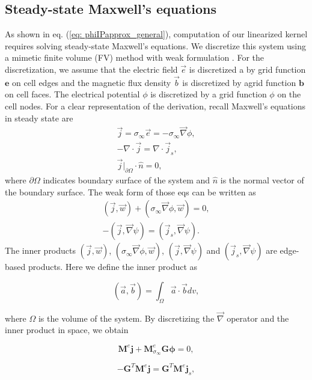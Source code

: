 \documentclass[extra,mreferee]{gji}
\renewcommand{\div}{\nabla\cdot}
\newcommand{\grad}{\vec \nabla}
\newcommand{\siginf}{\sigma_\infty}
\newcommand{\dgrad}{{\mathbf G}}
\newcommand{\M}{{\mathbf M}}
\newcommand{\MeSigInf}{{\M^e_{\sigma_\infty}}}
\newcommand{\Me}{{\M^e}}
\renewcommand {\j}  { {\vec j} }
\renewcommand {\b}  { {\vec b} }
\newcommand {\e}  { {\vec e} }
\renewcommand {\dj}  { {\mathbf{j} } }
\newcommand {\db}  { {\mathbf{b} } }
\newcommand {\de}  { {\mathbf{e} } }
\begin{document}
\subsection{Steady-state Maxwell's equations}
\label{section:maxwell_discrete}
As shown in eq. (\ref{eq: phiIPapprox_general}), computation of our linearized kernel requires solving steady-state Maxwell's equations. 
We discretize this system using a mimetic finite volume (FV) method with weak formulation \cite[]{Yee1966,Eldadbook}. 
For the discretization, we assume that the electric field $\e$ is discretized a by grid function $\de$ on cell edges and the magnetic flux density $\b$ is discretized by agrid function $\db$ on cell faces. 
The electrical potential $\phi$ is discretized by a grid function  $\phi$ on the cell nodes. For a clear representation of the derivation, recall Maxwell's equations in steady state are 
\begin{align}
  \j = \siginf\e = -\siginf\grad \phi, \\
  -\div \j = \div \j_s, \\
  \j\big|_{\partial \Omega}\cdot\hat{n} = 0,
  \label{eq:DCBCneumann}
\end{align}
where $\partial \Omega$ indicates boundary surface of the system and $\hat{n}$ is the normal vector of the boundary surface. The weak form of those eqs can be written as
\begin{align}
  (\j, \vec{w}) + (\siginf \grad \phi, \vec{w}) = 0, \\
  -(\j, \grad \psi) = (\j_s, \grad \psi).
\end{align}
The inner products $(\j, \vec{w})$, $(\siginf \grad \phi, \vec{w})$,  $(\j, \grad \psi)$ and $(\j_s, \grad \psi)$ are edge-based products. Here we define the inner product as
\begin{linenomath*}
\begin{equation}
  (\vec{a}, \vec{b}) = \int_{\Omega} \vec{a}\cdot\vec{b} dv,
\end{equation}
\end{linenomath*}
where $\Omega$ is the volume of the system. By discretizing the $\grad$ operator and the inner product in space, we obtain
\begin{linenomath*}
\begin{equation}
  \Me\dj + \MeSigInf\dgrad\boldsymbol{\phi} = 0,
  \label{eq:DCdisceq1}
\end{equation}
\end{linenomath*}
\begin{linenomath*}
\begin{equation}
  -\dgrad^T \Me\dj = \dgrad^T \Me\dj_s,
  \label{eq:DCdisceq2}
\end{equation}
\end{linenomath*}
\end{document}
